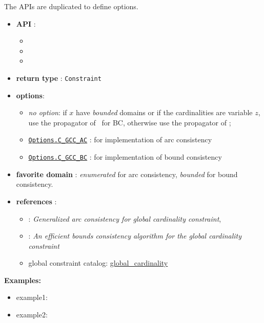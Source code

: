 The APIs are duplicated to define options. 

\begin{itemize}
	\item \textbf{API} :
      \begin{itemize}
	\item {}
	\item {}
	\item {}
      \end{itemize}
	\item \textbf{return type} : \texttt{Constraint}
	\item \textbf{options}:
	\begin{itemize}
		\item \emph{no option}: 
          if $x$ have \emph{bounded} domains or if the cardinalities are variable $z$, use the propagator of~\cite{QuimperCP03} for BC, otherwise use the propagator of \cite{ReginAAAI96};
		\item \hyperlink{cgccac:cgccacoptions}{\tt Options.C\_GCC\_AC} : for \cite{ReginAAAI96} implementation of arc consistency
		\item \hyperlink{cgccbc:cgccbcoptions}{\tt Options.C\_GCC\_BC} : for  \cite{QuimperCP03} implementation of bound consistency
	\end{itemize}
	\item \textbf{favorite domain} : \emph{enumerated} for arc consistency, \emph{bounded} for bound consistency.
	\item \textbf{references} :
      \begin{itemize}
      \item \cite{ReginAAAI96}: \emph{Generalized arc consistency for global cardinality constraint},
      \item \cite{QuimperCP03}: \emph{An efficient bounds consistency algorithm for the global cardinality constraint}
      \item global constraint catalog: \href{http://www.emn.fr/x-info/sdemasse/gccat/Cglobal_cardinality.html}{global\_cardinality}
      \end{itemize}
\end{itemize}

\textbf{Examples:}
\begin{itemize}
	\item example1:
\end{itemize}



\begin{itemize}
	\item example2:
\end{itemize}



